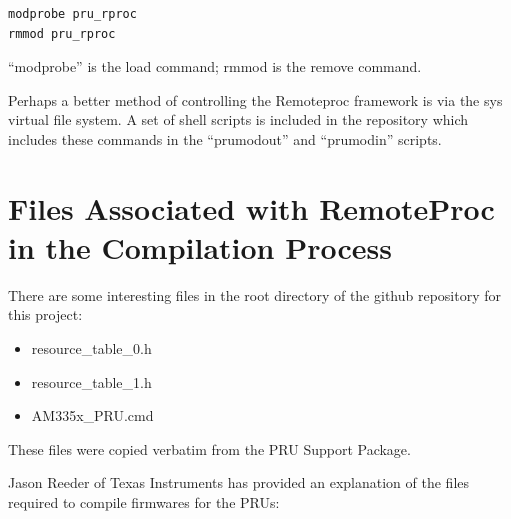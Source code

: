 \begin{verbatim}
modprobe pru_rproc
rmmod pru_rproc
\end{verbatim}

``modprobe'' is the load command; rmmod is the remove command.

Perhaps a better method of controlling the Remoteproc framework is via the sys virtual file system.  A set of shell scripts is included in the repository which includes these commands in the ``prumodout'' and ``prumodin'' scripts.

\section{Files Associated with RemoteProc in the Compilation Process}

There are some interesting files in the root directory of the github repository for this project:

\begin{itemize}
\item resource\_table\_0.h
\item resource\_table\_1.h
\item AM335x\_PRU.cmd
\end{itemize}

These files were copied verbatim from the PRU Support Package.

Jason Reeder of Texas Instruments has provided an explanation of the files required to compile firmwares for the PRUs:

